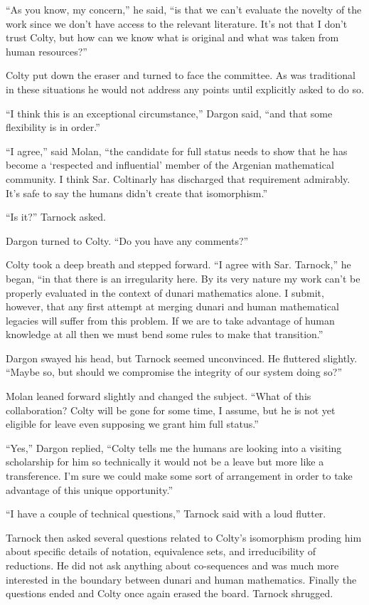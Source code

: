 ``As you know, my concern,'' he said, ``is that we can't evaluate the novelty of the work since
we don't have access to the relevant literature. It's not that I don't trust Colty, but how can
we know what is original and what was taken from human resources?''

Colty put down the eraser and turned to face the committee. As was traditional in these
situations he would not address any points until explicitly asked to do so.

``I think this is an exceptional circumstance,'' Dargon said, ``and that some flexibility is in
order.''

``I agree,'' said Molan, ``the candidate for full status needs to show that he has become a
`respected and influential' member of the Argenian mathematical community. I think Sar.
Coltinarly has discharged that requirement admirably. It's safe to say the humans didn't create
that isomorphism.''

``Is it?'' Tarnock asked.

Dargon turned to Colty. ``Do you have any comments?''

Colty took a deep breath and stepped forward. ``I agree with Sar. Tarnock,'' he began, ``in that
there is an irregularity here. By its very nature my work can't be properly evaluated in the
context of dunari mathematics alone. I submit, however, that any first attempt at merging dunari
and human mathematical legacies will suffer from this problem. If we are to take advantage of
human knowledge at all then we must bend some rules to make that transition.''

Dargon swayed his head, but Tarnock seemed unconvinced. He fluttered slightly. ``Maybe so, but
should we compromise the integrity of our system doing so?''

Molan leaned forward slightly and changed the subject. ``What of this collaboration? Colty will
be gone for some time, I assume, but he is not yet eligible for leave even supposing we grant
him full status.''

``Yes,'' Dargon replied, ``Colty tells me the humans are looking into a visiting scholarship for
him so technically it would not be a leave but more like a transference. I'm sure we could make
some sort of arrangement in order to take advantage of this unique opportunity.''

``I have a couple of technical questions,'' Tarnock said with a loud flutter.

Tarnock then asked several questions related to Colty's isomorphism proding him about specific
details of notation, equivalence sets, and irreducibility of reductions. He did not ask anything
about co-sequences and was much more interested in the boundary between dunari and human
mathematics. Finally the questions ended and Colty once again erased the board. Tarnock
shrugged.


